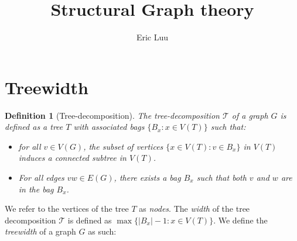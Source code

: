 \documentclass[]{article}
\title{Structural Graph theory}
\author{Eric Luu}
\newcommand{\tree}{\mathcal{T}}
\newtheorem{definition}[theorem]{Definition}
\theoremstyle{definition}
\numberwithin{theorem}{section}
\numberwithin{equation}{section}
\begin{document}
\maketitle

\section{Treewidth}

\begin{definition}[Tree-decomposition]
	The tree-decomposition $\tree$ of a graph $G$ is defined as a tree $T$ with associated \textit{bags} $\lbrace B_x : x \in V(T) \rbrace$ such that:
	\begin{itemize}
		\item for all $v \in V(G)$, the subset of vertices $\lbrace x \in V(T): v \in B_x \rbrace$ in $V(T)$ induces a connected subtree in $V(T)$.
		\item For all edges $vw \in E(G)$, there exists a bag $B_x$ such that both $v$ and $w$ are in the bag $B_x$.
	\end{itemize}
\end{definition}
We refer to the vertices of the tree $T$ as \textit{nodes}. 
The \textit{width} of the tree decomposition $\tree$ is defined as $\max \lbrace |B_x| - 1 : x \in V(T) \rbrace$. We define the \textit{treewidth} of a graph $G$ as such:
\end{document}

